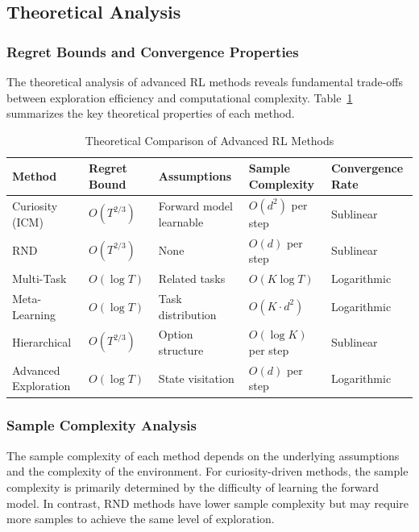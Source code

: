 \documentclass[12pt]{article}
\begin{document}
{{{\subsection{Theoretical Analysis}

\subsubsection{Regret Bounds and Convergence Properties}

The theoretical analysis of advanced RL methods reveals fundamental trade-offs between exploration efficiency and computational complexity. Table~\ref{tab:algorithm_comparison} summarizes the key theoretical properties of each method.

\begin{table}[h]
\centering
\caption{Theoretical Comparison of Advanced RL Methods}
\label{tab:algorithm_comparison}
\begin{tabular}{|l|l|l|l|l|}
\hline
\textbf{Method} & \textbf{Regret Bound} & \textbf{Assumptions} & \textbf{Sample Complexity} & \textbf{Convergence Rate} \\
\hline
Curiosity (ICM) & $O(T^{2/3})$ & Forward model learnable & $O(d^2)$ per step & Sublinear \\
RND & $O(T^{2/3})$ & None & $O(d)$ per step & Sublinear \\
Multi-Task & $O(\log T)$ & Related tasks & $O(K \log T)$ & Logarithmic \\
Meta-Learning & $O(\log T)$ & Task distribution & $O(K \cdot d^2)$ & Logarithmic \\
Hierarchical & $O(T^{2/3})$ & Option structure & $O(\log K)$ per step & Sublinear \\
Advanced Exploration & $O(\log T)$ & State visitation & $O(d)$ per step & Logarithmic \\
\hline
\end{tabular}
\end{table}

\subsubsection{Sample Complexity Analysis}

The sample complexity of each method depends on the underlying assumptions and the complexity of the environment. For curiosity-driven methods, the sample complexity is primarily determined by the difficulty of learning the forward model. In contrast, RND methods have lower sample complexity but may require more samples to achieve the same level of exploration.

}}}
\end{document}
